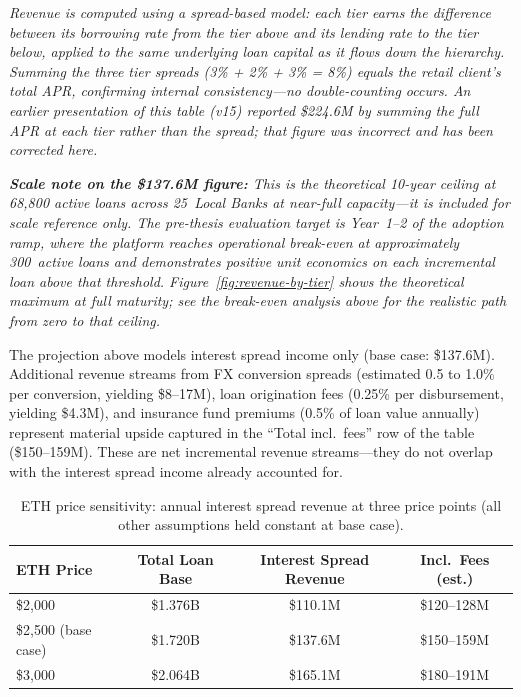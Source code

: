 \documentclass[12pt,a4paper]{report}
\newcommand{\tableheadcolor}{\rowcolor{black!8}}
\newcommand{\tableheadfont}{\bfseries\small}
\begin{document}
\vspace{2pt}
\noindent\textit{\small Revenue is computed using a \textit{spread-based} model: each tier earns the difference between its borrowing rate from the tier above and its lending rate to the tier below, applied to the same underlying loan capital as it flows down the hierarchy. Summing the three tier spreads (3\% + 2\% + 3\% = 8\%) equals the retail client's total APR, confirming internal consistency---no double-counting occurs. An earlier presentation of this table (v15) reported \$224.6M by summing the full APR at each tier rather than the spread; that figure was incorrect and has been corrected here.}

\vspace{4pt}
\noindent\textit{\small \textbf{Scale note on the \$137.6M figure:} This is the theoretical 10-year ceiling at 68,800 active loans across 25~Local Banks at near-full capacity---it is included for scale reference only. The pre-thesis evaluation target is Year~1--2 of the adoption ramp, where the platform reaches operational break-even at approximately 300~active loans and demonstrates positive unit economics on each incremental loan above that threshold. Figure~\ref{fig:revenue-by-tier} shows the theoretical maximum at full maturity; see the break-even analysis above for the realistic path from zero to that ceiling.}

\vspace{4pt}
\noindent The projection above models interest spread income only (base case: \$137.6M). Additional revenue streams from FX conversion spreads (estimated 0.5 to 1.0\% per conversion, yielding \$8--17M), loan origination fees (0.25\% per disbursement, yielding \$4.3M), and insurance fund premiums (0.5\% of loan value annually) represent material upside captured in the ``Total incl.\ fees'' row of the table (\$150--159M). These are net incremental revenue streams---they do not overlap with the interest spread income already accounted for.

\begin{table}[H]
\centering
\caption{ETH price sensitivity: annual interest spread revenue at three price points (all other assumptions held constant at base case).}
\label{tab:revenue-sensitivity}
\small
\renewcommand{\arraystretch}{1.2}
\begin{tabular}{@{}lccc@{}}
\toprule
\tableheadcolor
\tableheadfont ETH Price & \tableheadfont Total Loan Base & \tableheadfont Interest Spread Revenue & \tableheadfont Incl.\ Fees (est.) \\
\midrule
\$2{,}000 & \$1.376B & \$110.1M & \$120--128M \\
\rowcolor{RowShade}
\$2{,}500 (base case) & \$1.720B & \$137.6M & \$150--159M \\
\$3{,}000 & \$2.064B & \$165.1M & \$180--191M \\
\bottomrule
\end{tabular}
\end{table}
\end{document}
